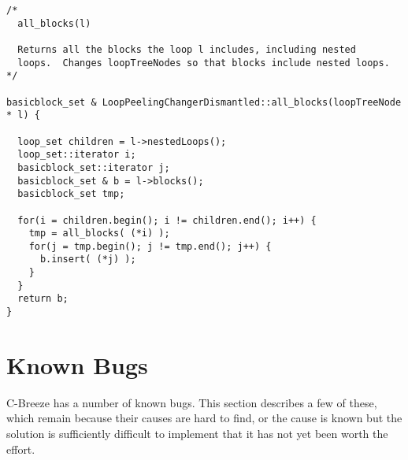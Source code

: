 \documentclass[10pt]{article}
\begin{document}
\begin{small}
\begin{verbatim}
/*
  all_blocks(l)

  Returns all the blocks the loop l includes, including nested
  loops.  Changes loopTreeNodes so that blocks include nested loops.
*/

basicblock_set & LoopPeelingChangerDismantled::all_blocks(loopTreeNode * l) {

  loop_set children = l->nestedLoops();
  loop_set::iterator i;
  basicblock_set::iterator j;
  basicblock_set & b = l->blocks();
  basicblock_set tmp;

  for(i = children.begin(); i != children.end(); i++) {
    tmp = all_blocks( (*i) );
    for(j = tmp.begin(); j != tmp.end(); j++) {
      b.insert( (*j) );
    }
  }
  return b;
}
\end{verbatim}
\end{small}

\section{Known Bugs}

C-Breeze has a number of known bugs.  This section describes a few of these,
which remain because their causes are hard to find, or the cause is known but
the solution is sufficiently difficult to implement that it has not yet been
worth the effort.
\end{document}
